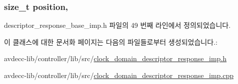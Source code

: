 \subsubsection[{\texorpdfstring{position}{position}}]{\setlength{\rightskip}{0pt plus 5cm}size\+\_\+t position\hspace{0.3cm}{\ttfamily [protected]}, {\ttfamily [inherited]}}\hypertarget{classavdecc__lib_1_1descriptor__response__base__imp_a7a04afe5347934be732ec70a70bd0a28}{}\label{classavdecc__lib_1_1descriptor__response__base__imp_a7a04afe5347934be732ec70a70bd0a28}


descriptor\+\_\+response\+\_\+base\+\_\+imp.\+h 파일의 49 번째 라인에서 정의되었습니다.



이 클래스에 대한 문서화 페이지는 다음의 파일들로부터 생성되었습니다.\+:\begin{DoxyCompactItemize}
\item 
avdecc-\/lib/controller/lib/src/\hyperlink{clock__domain__descriptor__response__imp_8h}{clock\+\_\+domain\+\_\+descriptor\+\_\+response\+\_\+imp.\+h}\item 
avdecc-\/lib/controller/lib/src/\hyperlink{clock__domain__descriptor__response__imp_8cpp}{clock\+\_\+domain\+\_\+descriptor\+\_\+response\+\_\+imp.\+cpp}\end{DoxyCompactItemize}
